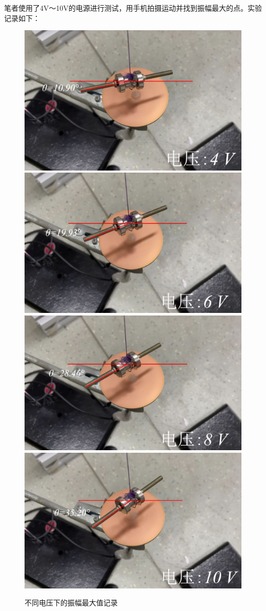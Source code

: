\documentclass{CLGPY}
\begin{document}
\begin{multicols}{1}
笔者使用了4V～10V的电源进行测试，用手机拍摄运动并找到振幅最大的点。实验记录如下：
        \begin{figure}[H]
            \centering
            \includegraphics[width=.72\linewidth]{./fig/img1.png}\\[4pt]
            \includegraphics[width=.72\linewidth]{./fig/img2.png}\\[4pt]
            \includegraphics[width=.72\linewidth]{./fig/img3.png}\\[4pt]
            \includegraphics[width=.72\linewidth]{./fig/img4.png}\\
            \caption{不同电压下的振幅最大值记录\label{fig:dtgy}}
        \end{figure}


\end{multicols}
\end{document}
